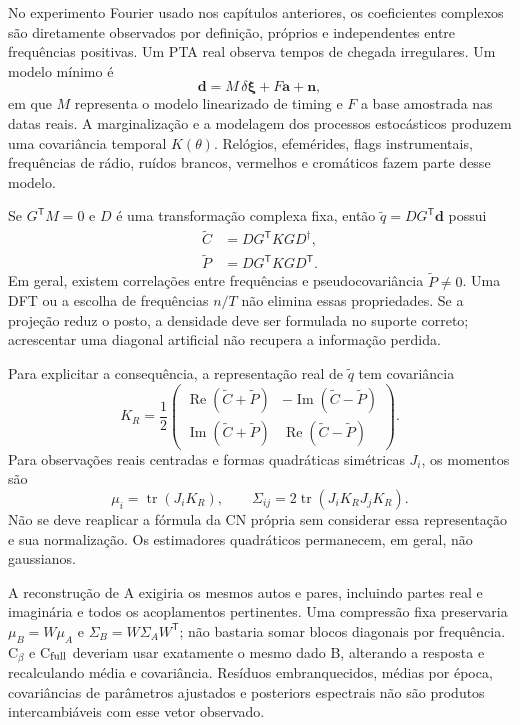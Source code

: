 No experimento Fourier usado nos capítulos anteriores, os coeficientes complexos são diretamente observados por definição, próprios e independentes entre frequências positivas. Um PTA real observa tempos de chegada irregulares. Um modelo mínimo é
\begin{equation}
 \boldsymbol d=M\,\delta\boldsymbol\xi+F\boldsymbol a+\boldsymbol n,
\end{equation}
em que $M$ representa o modelo linearizado de timing e $F$ a base amostrada nas datas reais. A marginalização e a modelagem dos processos estocásticos produzem uma covariância temporal $K(\theta)$. Relógios, efemérides, flags instrumentais, frequências de rádio, ruídos brancos, vermelhos e cromáticos fazem parte desse modelo.

Se $G^{\mathsf T}M=0$ e $D$ é uma transformação complexa fixa, então $\widetilde q=DG^{\mathsf T}\boldsymbol d$ possui
\begin{align}
 \widetilde C&=DG^{\mathsf T}KG D^\dagger,\\
 \widetilde P&=DG^{\mathsf T}KG D^{\mathsf T}.
\end{align}
Em geral, existem correlações entre frequências e pseudocovariância $\widetilde P\ne0$. Uma DFT ou a escolha de frequências $n/T$ não elimina essas propriedades. Se a projeção reduz o posto, a densidade deve ser formulada no suporte correto; acrescentar uma diagonal artificial não recupera a informação perdida.

Para explicitar a consequência, a representação real de $\widetilde q$ tem covariância
\begin{equation}
 K_R=\frac12\begin{pmatrix}
 \operatorname{Re}(\widetilde C+\widetilde P)&-\operatorname{Im}(\widetilde C-\widetilde P)\\
 \operatorname{Im}(\widetilde C+\widetilde P)&\operatorname{Re}(\widetilde C-\widetilde P)
 \end{pmatrix}.
\end{equation}
Para observações reais centradas e formas quadráticas simétricas $J_i$, os momentos são
\begin{equation}
 \mu_i=\operatorname{tr}(J_iK_R),\qquad
 \Sigma_{ij}=2\operatorname{tr}(J_iK_RJ_jK_R).
\end{equation}
Não se deve reaplicar a fórmula da CN própria sem considerar essa representação e sua normalização. Os estimadores quadráticos permanecem, em geral, não gaussianos.

A reconstrução de A exigiria os mesmos autos e pares, incluindo partes real e imaginária e todos os acoplamentos pertinentes. Uma compressão fixa preservaria $\mu_B=W\mu_A$ e $\Sigma_B=W\Sigma_AW^{\mathsf T}$; não bastaria somar blocos diagonais por frequência. C$_\beta$ e C$_{\rm full}$ deveriam usar exatamente o mesmo dado B, alterando a resposta e recalculando média e covariância. Resíduos embranquecidos, médias por época, covariâncias de parâmetros ajustados e posteriors espectrais não são produtos intercambiáveis com esse vetor observado.

